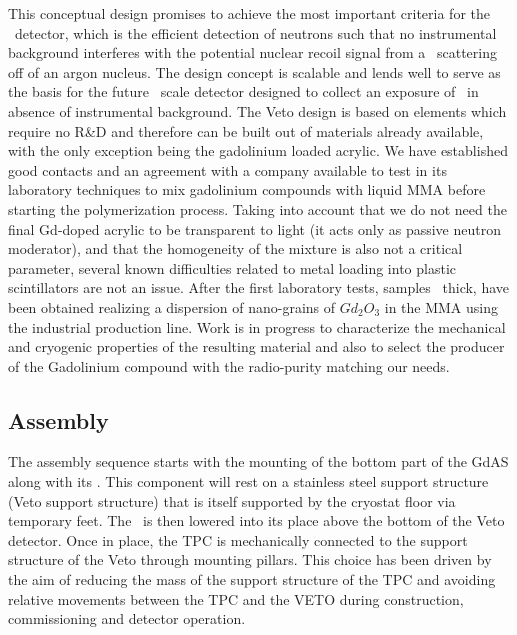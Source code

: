 This conceptual design promises to achieve the most important criteria for the \DSks\ detector, which is the efficient detection of neutrons such that no instrumental background interferes with the potential nuclear recoil signal from a \WIMP\ scattering off of an argon nucleus.   The design concept is scalable and lends well to serve as the basis for the future \ArgoTotalMass\ scale detector designed to collect an exposure of \ArgoExposure\ in absence of instrumental background. The Veto design is based on elements which require no R\&D and therefore can be built out of materials already available, with the only exception being the gadolinium loaded acrylic. We have established good contacts and an agreement with a company available to test in its laboratory techniques to mix gadolinium compounds with liquid MMA before starting the polymerization process. Taking into account that we do not need  the final Gd-doped acrylic to be transparent to light (it acts only as passive neutron moderator), and that the homogeneity of the mixture is also not a critical parameter, several known difficulties related to metal loading into plastic scintillators are not an issue.
After the first laboratory tests, samples \DSkVetoGdAsSheetThickness\ thick, have been obtained realizing a dispersion of nano-grains of $Gd_2O_3$ in the MMA using the industrial production line.
Work is in progress to characterize the mechanical and cryogenic properties of the resulting material and also to select the producer of the Gadolinium compound with the radio-purity 
matching our needs.


\subsection{Assembly}

The assembly sequence starts with the mounting of the bottom part of the GdAS along with its \DSkPdms. This component will rest on a stainless steel support structure (Veto support structure) that is itself supported by the cryostat floor via temporary feet. The \TPC\ is then lowered into its place above the bottom of the Veto detector. Once in place, the TPC is mechanically connected to the support structure of the Veto through mounting pillars. This choice has been driven by the aim of reducing the mass of the support structure of the TPC and avoiding relative movements between the TPC and the VETO during construction, commissioning and detector operation. 


